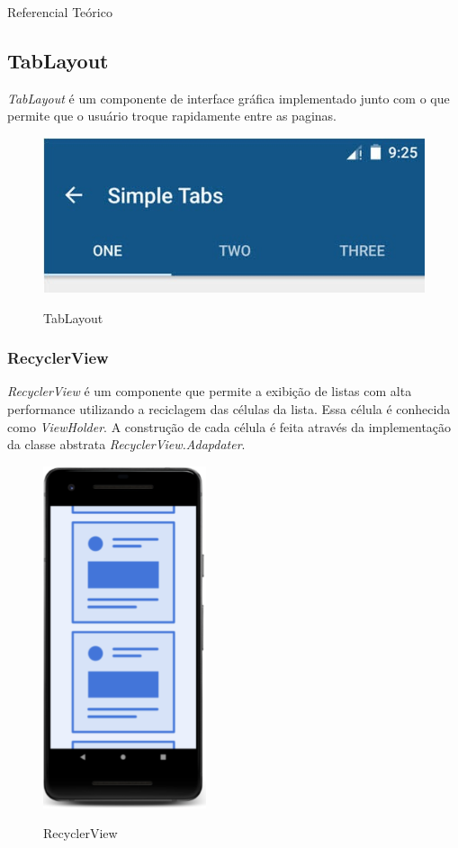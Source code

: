 \documentclass[
	12pt,				%
	openright,			%
	twoside,			%
	a4paper,			%
	english,			%
	french,				%
	spanish,			%
	brazil				%
	]{abntex2}
\begin{document}
\begin{chapter}{Referencial Teórico}
\subsection{TabLayout} \label{TabLayout}
\textit{TabLayout} é um componente de interface gráfica  implementado junto com o  que permite que o usuário troque rapidamente entre as paginas.
\begin{figure}[h]
\centering
   \caption{TabLayout}
   \includegraphics[scale=0.5]{media/tabs.jpg}
     \label{fig:tabs}
\end{figure}

\subsubsection{RecyclerView} \label{RecyclerView}
\textit{RecyclerView} é um componente que permite a exibição de listas com alta performance utilizando a reciclagem das células da lista. Essa célula é conhecida como \textit{ViewHolder}. A construção de cada célula é feita através da implementação da classe abstrata \textit{RecyclerView.Adapdater}.



\begin{figure}[h]
\centering
   \caption{RecyclerView}
   \includegraphics[scale=1.0]{media/recyclerview.png}
     \label{fig:recyclerview}
\end{figure}


\end{chapter}
\end{document}
